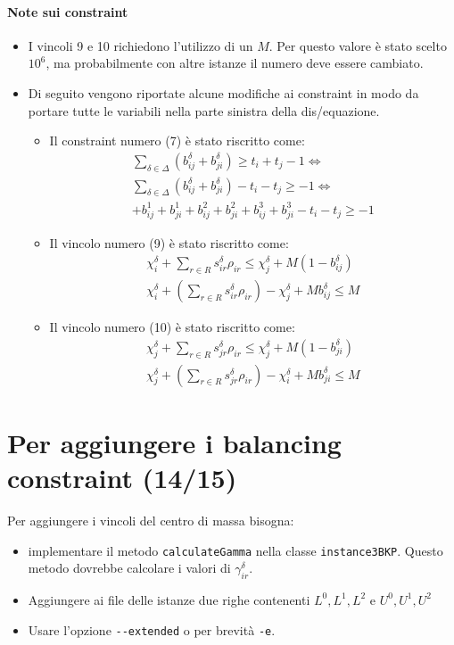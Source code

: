 \documentclass{scrartcl}
\begin{document}
\paragraph{Note sui constraint}
\begin{itemize}
	\item I vincoli 9 e 10 richiedono l'utilizzo di un $M$. Per questo
	valore è stato scelto $10^6$, ma probabilmente con altre istanze il numero deve essere cambiato.
	
	\item Di seguito vengono riportate alcune modifiche ai constraint in modo da portare
	tutte le variabili nella parte sinistra della dis/equazione.
	\begin{itemize}
	\item 
	Il constraint numero (7) è stato riscritto come:
	$$
	\begin{array}{l}
	\sum_{\delta \in \Delta}(b_{ij}^\delta + b_{ji}^\delta) \geq t_i + t_j - 1 \iff \\
	\sum_{\delta \in \Delta}(b_{ij}^\delta + b_{ji}^\delta) - t_i - t_j \geq - 1 \iff \\
	+ b_{ij}^1 + b_{ji}^1 + b_{ij}^2 + b_{ji}^2 + b_{ij}^3 + b_{ji}^3 - t_i - t_j \geq  -1
	\end{array}
	$$
	\item 
	Il vincolo numero (9) è stato riscritto come:
	$$
	\begin{array}{l}
	\chi_i^\delta + \sum_{r \in R} s_{ir}^\delta \rho_{ir} \leq \chi_j^\delta + M(1 - b_{ij}^\delta)\\
	\chi_i^\delta + (\sum_{r \in R} s_{ir}^\delta \rho_{ir}) -  \chi_j^\delta + M b_{ij}^\delta \leq M
	\end{array}
	$$
	\item 
	Il vincolo numero (10) è stato riscritto come:
	$$
	\begin{array}{l}
	\chi_j^\delta + \sum_{r \in R} s_{jr}^\delta \rho_{ir} \leq \chi_j^\delta + M(1 - b_{ji}^\delta)\\
	\chi_j^\delta + (\sum_{r \in R} s_{jr}^\delta \rho_{ir}) -  \chi_i^\delta + M b_{ji}^\delta \leq M
	\end{array}
	$$
\end{itemize}
\end{itemize}
\section{Per aggiungere i balancing constraint (14/15)}
Per aggiungere i vincoli del centro di massa bisogna:
\begin{itemize}
	\item implementare il metodo \verb|calculateGamma| nella classe \verb|instance3BKP|.
	Questo metodo dovrebbe calcolare i valori di $\gamma_{ir}^\delta$.
	\item Aggiungere ai file delle istanze due righe contenenti $L^0, L^1, L^2$ e $U^0, U^1, U^2$
	\item Usare l'opzione \verb|--extended| o per brevità \verb|-e|.
\end{itemize}
\end{document}
